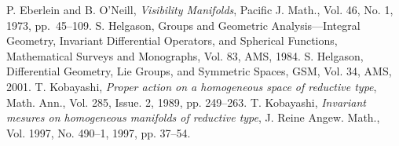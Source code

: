  P. Eberlein and B. O'Neill, \textit{Visibility Manifolds}, Pacific J. Math., Vol. 46, No. 1, 1973, pp.~45--109.
   S. Helgason, Groups and Geometric Analysis---Integral Geometry, Invariant Differential Operators, and Spherical Functions, Mathematical Surveys and Monographs, Vol. 83, AMS, 1984.
 S. Helgason, Differential Geometry, Lie Groups, and Symmetric Spaces, GSM, Vol. 34, AMS, 2001.
   T. Kobayashi, 
  \textit{Proper action on a homogeneous space of reductive type},
  Math. Ann., Vol. 285, Issue. 2, 1989, pp. 249--263.  
 T. Kobayashi, \textit{Invariant mesures on homogeneous manifolds of reductive type}, J. Reine Angew. Math., Vol. 1997, No. 490--1, 1997, pp. 37--54.

